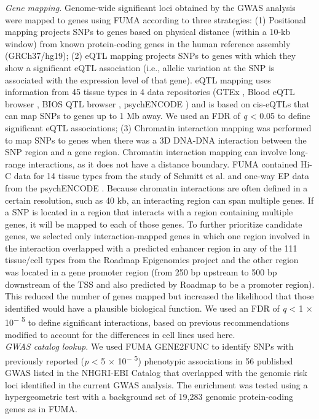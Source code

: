 \begin{refsection}
\noindent
\textit{Gene mapping.} Genome-wide significant loci obtained by the GWAS analysis were mapped to genes using FUMA \citep{watanabe2017functional} according to three strategies: (1) Positional mapping projects SNPs to genes based on physical distance (within a 10-kb window) from known protein-coding genes in the human reference assembly (GRCh37/hg19); (2) eQTL mapping projects SNPs to genes with which they show a significant eQTL association (i.e., allelic variation at the SNP is associated with the expression level of that gene). eQTL mapping uses information from 45 tissue types in 4 data repositories (GTEx \citep{Ardlie2015TheGE}, Blood eQTL browser \citep{Westra2013SystematicIO}, BIOS QTL browser \citep{Zhernakova2017IdentificationOC}, psychENCODE \citep{wang2018comprehensive}) and is based on cis-eQTLs that can map SNPs to genes up to 1 Mb away. We used an FDR of \textit{q} < 0.05 to define significant eQTL associations; (3) Chromatin interaction mapping was performed to map SNPs to genes when there was a 3D DNA-DNA interaction between the SNP region and a gene region. Chromatin interaction mapping can involve long-range interactions, as it does not have a distance boundary. FUMA contained Hi-C data for 14 tissue types from the study of Schmitt et al. \citep{Schmitt2016ACO} and one-way EP data from the psychENCODE \citep{wang2018comprehensive}. Because chromatin interactions are often defined in a certain resolution, such as 40 kb, an interacting region can span multiple genes. If a SNP is located in a region that interacts with a region containing multiple genes, it will be mapped to each of those genes. To further prioritize candidate genes, we selected only interaction-mapped genes in which one region involved in the interaction overlapped with a predicted enhancer region in any of the 111 tissue/cell types from the Roadmap Epigenomics project \citep{Consortium2015IntegrativeAO} and the other region was located in a gene promoter region (from 250 bp upstream to 500 bp downstream of the TSS and also predicted by Roadmap to be a promoter region). This reduced the number of genes mapped but increased the likelihood that those identified would have a plausible biological function. We used an FDR of \textit{q} < 1 $ \times $  10\textsuperscript{$-$ 5} to define significant interactions, based on previous recommendations \citep{Schmitt2016ACO} modified to account for the differences in cell lines used here.\\

\noindent
\textit{GWAS catalog lookup.} We used FUMA GENE2FUNC \citep{watanabe2017functional} to identify SNPs with previously reported (\textit{p} < 5 $ \times $  10\textsuperscript{$-$ 5}) phenotypic associations in 56 published GWAS listed in the NHGRI-EBI Catalog \citep{MacArthur2017TheNN} that overlapped with the genomic risk loci identified in the current GWAS analysis. The enrichment was tested using a hypergeometric test with a background set of 19,283 genomic protein-coding genes as in FUMA. \\


\end{refsection}
